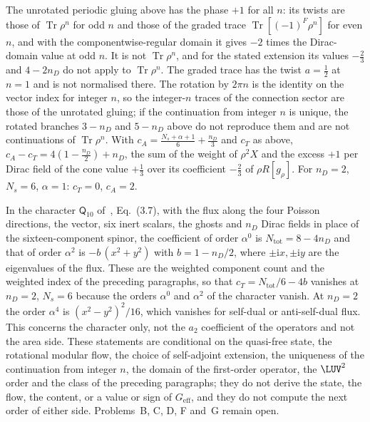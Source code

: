 The unrotated periodic gluing above has the phase \(+1\) for all \(n\): its twists are those of \(\operatorname{Tr}\rho^n\) for odd \(n\) and those of the graded trace \(\operatorname{Tr}[(-1)^F\rho^n]\) for even \(n\), and with the componentwise-regular domain it gives \(-2\) times the Dirac-domain value at odd \(n\). It is not \(\operatorname{Tr}\rho^n\), and for the stated extension its values \(-\tfrac23\) and \(4-2n_D\) do not apply to \(\operatorname{Tr}\rho^n\). The graded trace has the twist \(a=\tfrac12\) at \(n=1\) and is not normalised there. The rotation by \(2\pi n\) is the identity on the vector index for integer \(n\), so the integer-\(n\) traces of the connection sector are those of the unrotated gluing; if the continuation from integer \(n\) is unique, the rotated branches \(3-n_D\) and \(5-n_D\) above do not reproduce them and are not continuations of \(\operatorname{Tr}\rho^n\). With \(c_A=\tfrac{N_s+\alpha+1}6+\tfrac{n_D}3\) and \(c_T\) as above, \(c_A-c_T=4(1-\tfrac{n_D}2)+n_D\), the sum of the weight of \(\rho^2X\) and the excess \(+1\) per Dirac field of the cone value \(+\tfrac13\) over its coefficient \(-\tfrac23\) of \(\rho R[g_\rho]\). For \(n_D=2\), \(N_s=6\), \(\alpha=1\): \(c_T=0\), \(c_A=2\).

In the character \(\mathsf Q_{10}\) of~\cite{MantaSteinackerTran2024}, Eq.~(3.7), with the flux along the four Poisson directions, the vector, six inert scalars, the ghosts and \(n_D\) Dirac fields in place of the sixteen-component spinor, the coefficient of order \(\alpha^0\) is \(N_{\mathrm{tot}}=8-4n_D\) and that of order \(\alpha^2\) is \(-b\,(x^2+y^2)\) with \(b=1-n_D/2\), where \(\pm\mathrm ix,\pm\mathrm iy\) are the eigenvalues of the flux. These are the weighted component count and the weighted index of the preceding paragraphs, so that \(c_T=N_{\mathrm{tot}}/6-4b\) vanishes at \(n_D=2\), \(N_s=6\) because the orders \(\alpha^0\) and \(\alpha^2\) of the character vanish. At \(n_D=2\) the order \(\alpha^4\) is \((x^2-y^2)^2/16\), which vanishes for self-dual or anti-self-dual flux. This concerns the character only, not the \(a_2\) coefficient of the operators and not the area side. These statements are conditional on the quasi-free state, the rotational modular flow, the choice of self-adjoint extension, the uniqueness of the continuation from integer \(n\), the domain of the first-order operator, the \(\LUV^2\) order and the class of the preceding paragraphs; they do not derive the state, the flow, the content, or a value or sign of \(G_{\mathrm{eff}}\), and they do not compute the next order of either side. Problems~B, C, D, F and~G remain open.
